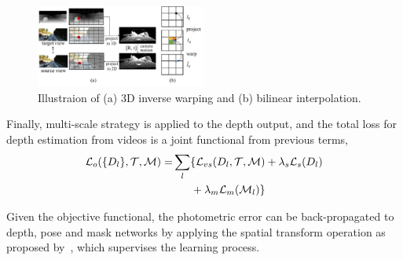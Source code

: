 \begin{figure}
\centering
\includegraphics[width=0.5\textwidth]{figures/3d_warping_comp.pdf}
\caption{Illustraion of (a) 3D inverse warping and (b) bilinear interpolation.}
\label{fig:3d_warping}
\vspace{-1\baselineskip}
\end{figure}

Finally, multi-scale strategy is applied to the depth output, and the total loss for depth estimation from videos is a joint functional from previous terms,
\begin{align}
\label{eqn:full}
{\mathcal L}_{o}(\{D_l\}, {\mathcal T}, {\mathcal M}) =& \sum_l\{{\mathcal L}_{vs}(D_l,{\mathcal T},{\mathcal M}) + \lambda_s{\mathcal L}_{s}(D_l) \nonumber\\
&\text{~~~~~} + \lambda_m{\mathcal L}_{m}({\mathcal M}_l)\}
\end{align}

Given the objective functional, the photometric error can be back-propagated to depth, pose and mask networks by applying the spatial transform operation as proposed by~\cite{jaderberg2015spatial}, which supervises the learning process.

